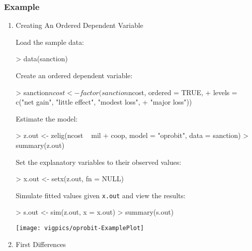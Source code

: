 \subsubsection{Example}
\begin{enumerate}
\item {Creating An Ordered Dependent Variable} \label{ord.fact.p}

Load the sample data:  
\begin{Schunk}
\begin{Sinput}
> data(sanction)
\end{Sinput}
\end{Schunk}
Create an ordered dependent variable: 
\begin{Schunk}
\begin{Sinput}
> sanction$ncost <- factor(sanction$ncost, ordered = TRUE, 
+     levels = c("net gain", "little effect", "modest loss", 
+         "major loss"))
\end{Sinput}
\end{Schunk}
Estimate the model:
\begin{Schunk}
\begin{Sinput}
> z.out <- zelig(ncost ~ mil + coop, model = "oprobit", data = sanction)
> summary(z.out)
\end{Sinput}
\end{Schunk}
Set the explanatory variables to their observed values:  
\begin{Schunk}
\begin{Sinput}
> x.out <- setx(z.out, fn = NULL)
\end{Sinput}
\end{Schunk}
Simulate fitted values given {\tt x.out} and view the results:
\begin{Schunk}
\begin{Sinput}
> s.out <- sim(z.out, x = x.out)
> summary(s.out)
\end{Sinput}
\end{Schunk}
\begin{center}
\texttt{[image: vigpics/oprobit-ExamplePlot]}
\end{center}

\item {First Differences}


\end{enumerate}
